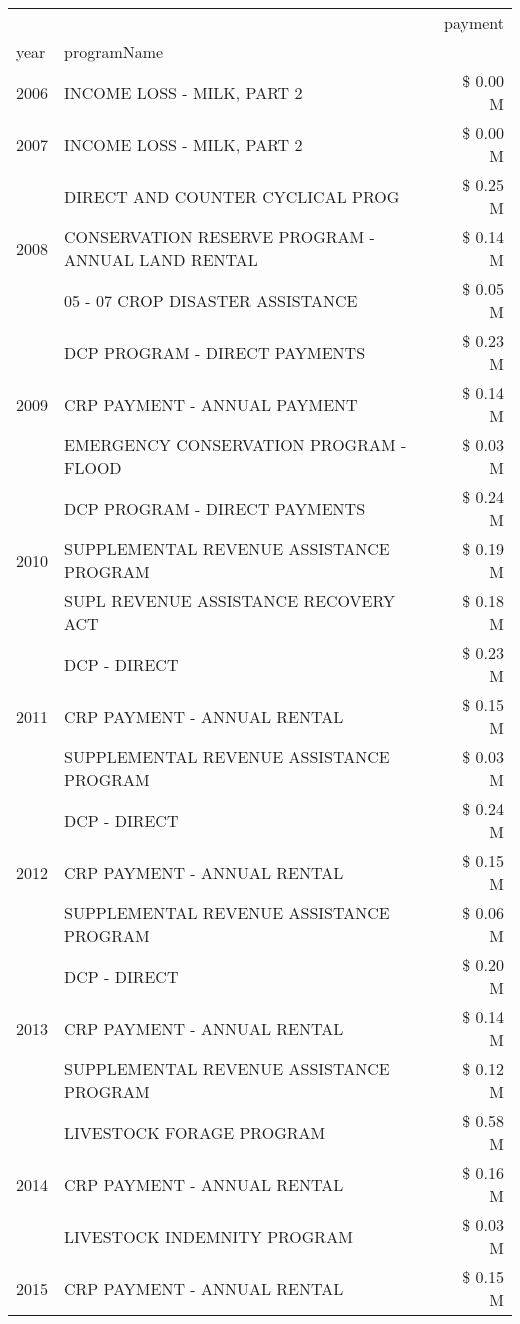 \begin{tabular}{llr}
\toprule
 &  & payment \\
year & programName &  \\
\midrule
2006 & INCOME LOSS - MILK, PART 2 & \$ 0.00 M \\
\cline{1-3}
2007 & INCOME LOSS - MILK, PART 2 & \$ 0.00 M \\
\cline{1-3}
\multirow[t]{3}{*}{2008} & DIRECT AND COUNTER CYCLICAL PROG & \$ 0.25 M \\
 & CONSERVATION RESERVE PROGRAM - ANNUAL LAND RENTAL & \$ 0.14 M \\
 & 05 - 07 CROP DISASTER ASSISTANCE & \$ 0.05 M \\
\cline{1-3}
\multirow[t]{3}{*}{2009} & DCP PROGRAM - DIRECT PAYMENTS & \$ 0.23 M \\
 & CRP PAYMENT - ANNUAL PAYMENT & \$ 0.14 M \\
 & EMERGENCY CONSERVATION PROGRAM - FLOOD & \$ 0.03 M \\
\cline{1-3}
\multirow[t]{3}{*}{2010} & DCP PROGRAM - DIRECT PAYMENTS & \$ 0.24 M \\
 & SUPPLEMENTAL REVENUE ASSISTANCE PROGRAM & \$ 0.19 M \\
 & SUPL REVENUE ASSISTANCE RECOVERY ACT & \$ 0.18 M \\
\cline{1-3}
\multirow[t]{3}{*}{2011} & DCP - DIRECT & \$ 0.23 M \\
 & CRP PAYMENT - ANNUAL RENTAL & \$ 0.15 M \\
 & SUPPLEMENTAL REVENUE ASSISTANCE PROGRAM & \$ 0.03 M \\
\cline{1-3}
\multirow[t]{3}{*}{2012} & DCP - DIRECT & \$ 0.24 M \\
 & CRP PAYMENT - ANNUAL RENTAL & \$ 0.15 M \\
 & SUPPLEMENTAL REVENUE ASSISTANCE PROGRAM & \$ 0.06 M \\
\cline{1-3}
\multirow[t]{3}{*}{2013} & DCP - DIRECT & \$ 0.20 M \\
 & CRP PAYMENT - ANNUAL RENTAL & \$ 0.14 M \\
 & SUPPLEMENTAL REVENUE ASSISTANCE PROGRAM & \$ 0.12 M \\
\cline{1-3}
\multirow[t]{3}{*}{2014} & LIVESTOCK FORAGE PROGRAM & \$ 0.58 M \\
 & CRP PAYMENT - ANNUAL RENTAL & \$ 0.16 M \\
 & LIVESTOCK INDEMNITY PROGRAM & \$ 0.03 M \\
\cline{1-3}
\multirow[t]{3}{*}{2015} & CRP PAYMENT - ANNUAL RENTAL & \$ 0.15 M \\

\end{tabular}

